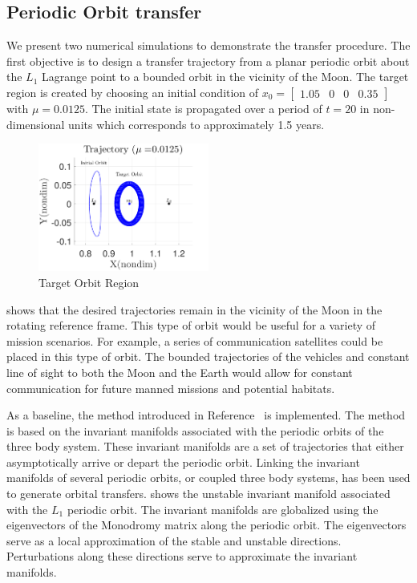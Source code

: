 \documentclass[preprint]{elsarticle}
\begin{document}
\subsection{Periodic Orbit transfer}
We present two numerical simulations to demonstrate the transfer procedure.
The first objective is to design a transfer trajectory from a planar periodic orbit about the \( L_1\) Lagrange point to a bounded orbit in the vicinity of the Moon.
The target region is created by choosing an initial condition of \( x_0 = \begin{bmatrix}1.05 & 0 & 0 & 0.35 \end{bmatrix} \) with \( \mu = 0.0125 \).
The initial state is propagated over a period of \( t = \num{20} \) in non-dimensional units which corresponds to approximately \num{1.5} years.
\begin{figure}[htbp]
   \centering
   \includegraphics[width=0.5\textwidth]{moon_orbit} %
   \caption{Target Orbit Region}
   \label{fig:moon_orbit}
\end{figure}
 shows that the desired trajectories remain in the vicinity of the Moon in the rotating reference frame. 
This type of orbit would be useful for a variety of mission scenarios.
For example, a series of communication satellites could be placed in this type of orbit. 
The bounded trajectories of the vehicles and constant line of sight to both the Moon and the Earth would allow for constant communication for future manned missions and potential habitats.

As a baseline, the method introduced in Reference~ is implemented.
The method is based on the invariant manifolds associated with the periodic orbits of the three body system.
These invariant manifolds are a set of trajectories that either asymptotically arrive or depart the periodic orbit. 
Linking the invariant manifolds of several periodic orbits, or coupled three body systems, has been used to generate orbital transfers.
 shows the unstable invariant manifold associated with the \( L_1\) periodic orbit. 
The invariant manifolds are globalized using the eigenvectors of the Monodromy matrix along the periodic orbit.
The eigenvectors serve as a local approximation of the stable and unstable directions. 
Perturbations along these directions serve to approximate the invariant manifolds.
\end{document}
